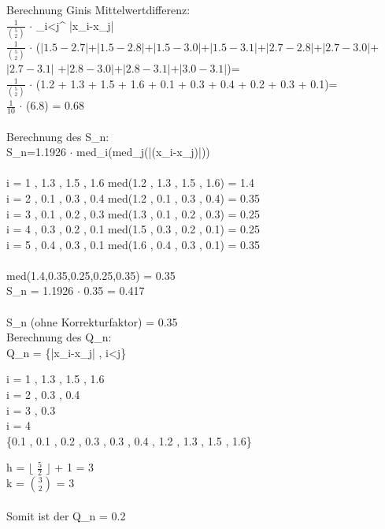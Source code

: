 \documentclass[a4paper,12pt]{article}
\begin{document}
    Berechnung Ginis Mittelwertdifferenz:\\
    
   
    $\frac{1}{\binom{5}{2}}$ $\cdot$ \sum_{i<j}^{} |x_{i}-x_{j}|\\
   
    $\frac{1}{\binom{5}{2}}$ $\cdot$ ($|1.5-2.7|$+$|1.5-2.8|$+$|1.5-3.0|$+$|1.5-3.1|$+$|2.7-2.8|$+$|2.7-3.0|$+$|2.7-3.1|$
    +$|2.8-3.0|$+$|2.8-3.1|$+$|3.0-3.1|$)=\\
    $\frac{1}{\binom{5}{2}}$ $\cdot$ (1.2 + 1.3 + 1.5 + 1.6 + 0.1 + 0.3 + 0.4 + 0.2 + 0.3 + 0.1)=\\
     $\frac{1}{10}$ $\cdot$ (6.8) = 0.68
     \\\\
     \newpage
     Berechnung des S_{n}:\\
     
     S_{n}=1.1926 $\cdot$ med_{i}(med_{j}(|(x_{i}-x_{j})|)) \\\\
     
     i = 1 , 1.3 , 1.5 , 1.6  med(1.2 , 1.3 , 1.5 , 1.6) = 1.4\\
     i = 2 , 0.1 , 0.3 , 0.4  med(1.2 , 0.1 , 0.3 , 0.4) = 0.35\\
     i = 3 , 0.1 , 0.2 , 0.3  med(1.3 , 0.1 , 0.2 , 0.3) = 0.25\\
     i = 4 , 0.3 , 0.2 , 0.1  med(1.5 , 0.3 , 0.2 , 0.1) = 0.25\\
     i = 5 , 0.4 , 0.3 , 0.1  med(1.6 , 0.4 , 0.3 , 0.1) = 0.35\\\\
     
     med(1.4,0.35,0.25,0.25,0.35) = 0.35\\
     S_{n} = 1.1926 $\cdot$ 0.35 = 0.417 \\\\
     S_{n} (ohne Korrekturfaktor) = 0.35\\
     
     Berechnung des Q_{n}:\\
    
    Q_{n} = \{|x_{i}-x_{j}| \; , i<j\}
    
    i = 1 , 1.3 , 1.5 , 1.6\\
    i = 2 , 0.3 , 0.4 \\
    i = 3 , 0.3\\
    i = 4\\
    
    \{0.1 , 0.1 , 0.2 , 0.3 , 0.3 , 0.4 , 1.2 , 1.3 , 1.5 , 1.6\}
    
    h =  \left$\lfloor$ $\frac{5}{2}$ \right$\rfloor$ + 1 = 3 \\
    k = $\binom{3}{2}$ = 3\\\\
    
    Somit ist der Q_{n} = 0.2
    
	
\end{document}

